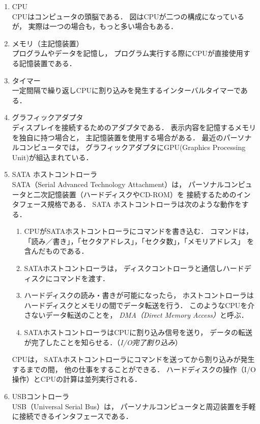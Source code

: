 \begin{enumerate}
\item CPU \\
  CPUはコンピュータの頭脳である．
  図はCPUが二つの構成になっているが，
  実際は一つの場合も，もっと多い場合もある．
\item メモリ（主記憶装置） \\
  プログラムやデータを記憶し，
  プログラム実行する際にCPUが直接使用する記憶装置である．
\item タイマー \\
  一定間隔で繰り返しCPUに割り込みを発生するインターバルタイマーである．
\item グラフィックアダプタ \\
  ディスプレイを接続するためのアダプタである．
  表示内容を記憶するメモリを独自に持つ場合と，
  主記憶装置を使用する場合がある．
  最近のパーソナルコンピュータでは，
  グラフィックアダプタにGPU(Graphics Processing Unit)が組込まれている．
\item SATA ホストコントローラ　\\
  SATA（Serial Advanced Technology Attachment）は，
  パーソナルコンピュータと二次記憶装置（ハードディスクやCD-ROM）を
  接続するためのインタフェース規格である．
  SATA ホストコントローラは次のような動作をする．
  \begin{enumerate}
  \item CPUがSATAホストコントローラにコマンドを書き込む．
    コマンドは，
    「読み／書き」，「セクタアドレス」，「セクタ数」，「メモリアドレス」
    を含んだものである．
  \item SATAホストコントローラは，
    ディスクコントローラと通信しハードディスクにコマンドを渡す．
  \item ハードディスクの読み・書きが可能になったら，
    ホストコントローラはハードディスクとメモリの間でデータ転送を行う．
    このようなCPUを介さないデータ転送のことを，
    \emph{DMA（Direct Memory Access）}\label{dma}と呼ぶ．
  \item SATAホストコントローラはCPUに割り込み信号を送り，
    データの転送が完了したことを知らせる．（\emph{I/O完了割り込み}）
  \end{enumerate}
  CPUは，
  SATAホストコントローラにコマンドを送ってから割り込みが発生するまでの間，
  他の仕事をすることができる．
  ハードディスクの操作（I/O操作）とCPUの計算は並列実行される．
\item USBコントローラ \\
  USB（Universal Serial Bus）は，
  パーソナルコンピュータと周辺装置を手軽に接続できるインタフェースである．

\end{enumerate}
